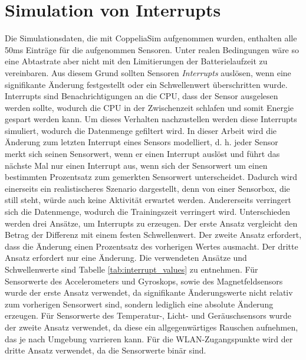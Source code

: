 \section{Simulation von Interrupts}
Die Simulationsdaten, die mit CoppeliaSim aufgenommen wurden, enthalten alle 50ms Einträge für die aufgenommen Sensoren.
Unter realen Bedingungen wäre so eine Abtastrate aber nicht mit den Limitierungen der Batterielaufzeit zu vereinbaren.
Aus diesem Grund sollten Sensoren \textit{Interrupts} auslösen, wenn eine signifikante Änderung festgestellt oder ein Schwellenwert überschritten wurde.
Interrupts sind Benachrichtigungen an die CPU, dass der Sensor ausgelesen werden sollte, wodurch die CPU in der Zwischenzeit schlafen und somit Energie gespart werden kann.
\newline
\newline
Um dieses Verhalten nachzustellen werden diese Interrupts simuliert, wodurch die Datenmenge gefiltert wird.
In dieser Arbeit wird die Änderung zum letzten Interrupt eines Sensors modelliert,
d. h. jeder Sensor merkt sich seinen Sensorwert, wenn er einen Interrupt auslöst
und führt das nächste Mal nur einen Interrupt aus, wenn sich der Sensorwert um einen bestimmten Prozentsatz zum gemerkten Sensorwert unterscheidet.
\newline
\newline
Dadurch wird einerseits ein realistischeres Szenario dargestellt,
denn von einer Sensorbox, die still steht, würde auch keine Aktivität erwartet werden.
Andererseits verringert sich die Datenmenge, wodurch die Trainingszeit verringert wird.
\newpage
Unterschieden werden drei Ansätze, um Interrupts zu erzeugen.
Der erste Ansatz vergleicht den Betrag der Differenz mit einem festen Schwellenwert.
Der zweite Ansatz erfordert, dass die Änderung einen Prozentsatz des vorherigen Wertes ausmacht.
Der dritte Ansatz erfordert nur eine Änderung.
\newline
\newline
Die verwendeten Ansätze und Schwellenwerte sind Tabelle \ref{tab:interrupt_values} zu entnehmen.
Für Sensorwerte des Accelerometers und Gyroskops, sowie des Magnetfeldsensors wurde der erste Ansatz verwendet,
da signifikante Änderungswerte nicht relativ zum vorherigen Sensorwert sind, sondern lediglich eine absolute Änderung erzeugen.
Für Sensorwerte des Temperatur-, Licht- und Geräuschsensors wurde der zweite Ansatz verwendet,
da diese ein allgegenwärtiges Rauschen aufnehmen, das je nach Umgebung varrieren kann.
Für die WLAN-Zugangspunkte wird der dritte Ansatz verwendet, da die Sensorwerte binär sind.
